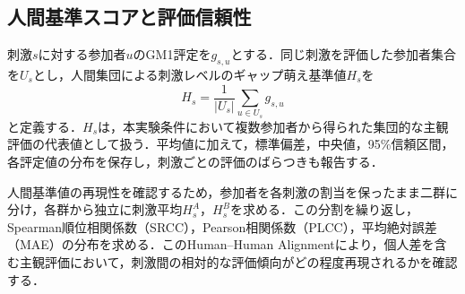 \documentclass[a4j,twocolumn,11pt]{jarticle}
\begin{document}





\subsection{人間基準スコアと評価信頼性}
刺激$s$に対する参加者$u$のGM1評定を$g_{s,u}$とする．同じ刺激を評価した参加者集合を$U_s$とし，人間集団による刺激レベルのギャップ萌え基準値$H_s$を
\begin{equation}
 H_s=\frac{1}{|U_s|}\sum_{u\in U_s}g_{s,u}
\end{equation}
と定義する．$H_s$は，本実験条件において複数参加者から得られた集団的な主観評価の代表値として扱う．平均値に加えて，標準偏差，中央値，95\%信頼区間，各評定値の分布を保存し，刺激ごとの評価のばらつきも報告する．

人間基準値の再現性を確認するため，参加者を各刺激の割当を保ったまま二群に分け，各群から独立に刺激平均$H_s^{A}$，$H_s^{B}$を求める．この分割を繰り返し，Spearman順位相関係数（SRCC），Pearson相関係数（PLCC），平均絶対誤差（MAE）の分布を求める．このHuman--Human Alignmentにより，個人差を含む主観評価において，刺激間の相対的な評価傾向がどの程度再現されるかを確認する．
\end{document}
